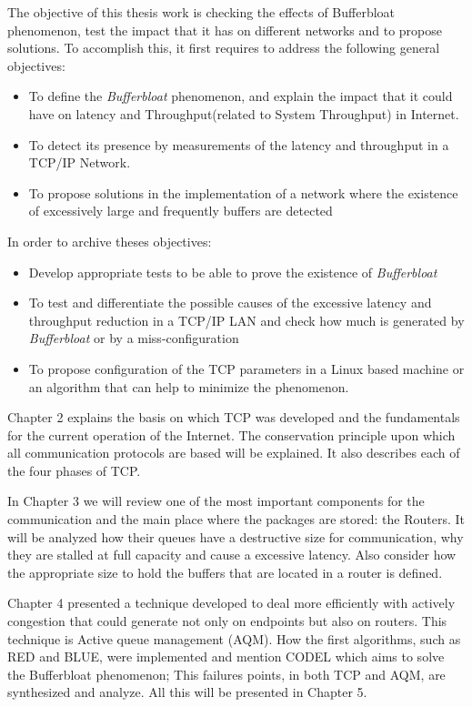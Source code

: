 The objective of this thesis work is checking the effects of
Bufferbloat phenomenon, test the impact that it has on different networks
and to propose solutions. To accomplish this, it first requires to
address the following general objectives:

\begin{itemize}
	\item To define the \textit{Bufferbloat} phenomenon, and explain the impact that it could have on latency and \gls{Throughput}(related to \gls{System Throughput}) in Internet.
	\item To detect its presence by measurements of the latency and throughput in a TCP/IP Network.
	\item To propose solutions in the implementation of a network where the existence of excessively large and frequently buffers are detected
\end{itemize}

In order to archive theses objectives:

\begin{itemize}
\item Develop appropriate tests to be able to prove the existence of \textit{Bufferbloat}
\item To test and differentiate the possible causes of the excessive latency and throughput reduction in a TCP/IP LAN and check how much is generated by \textit{Bufferbloat} or by a miss-configuration
\item To propose configuration of the TCP parameters in a Linux based machine or an algorithm that can help to minimize the phenomenon.
\end{itemize}

Chapter 2 explains the basis on which TCP was developed and
the fundamentals for the current operation of the Internet. The conservation
principle upon which all communication protocols are based will be explained.
It also describes each of the four phases of TCP.

In Chapter 3 we will review one of the most important components for the
communication and the main place where the packages are stored: the Routers.
It will be analyzed how their queues have a destructive size for
communication, why they are stalled at full capacity and cause a excessive
latency. Also consider how the appropriate size to hold the buffers that are
located in a router is defined.

Chapter 4 presented a technique developed to deal more efficiently with
actively congestion that could generate not only on endpoints but also on
routers. This technique is Active queue management (AQM). How the first
algorithms, such as RED and BLUE, were implemented and mention
CODEL which aims to solve the Bufferbloat phenomenon; This failures points,
in both TCP and AQM, are synthesized and analyze. All this will be presented in
Chapter 5.

